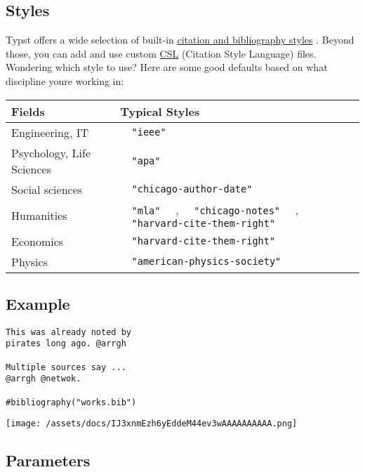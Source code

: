 \subsection{Styles}\label{styles}

Typst offers a wide selection of built-in
\href{/docs/reference/model/bibliography/\#parameters-style}{citation
and bibliography styles} . Beyond those, you can add and use custom
\href{https://citationstyles.org/}{CSL} (Citation Style Language) files.
Wondering which style to use? Here are some good defaults based on what
discipline you\textquotesingle re working in:

\begin{longtable}[]{@{}ll@{}}
\toprule\noalign{}
Fields & Typical Styles \\
\midrule\noalign{}
\endhead
\bottomrule\noalign{}
\endlastfoot
Engineering, IT & \texttt{\ }{\texttt{\ "ieee"\ }}\texttt{\ } \\
Psychology, Life Sciences &
\texttt{\ }{\texttt{\ "apa"\ }}\texttt{\ } \\
Social sciences &
\texttt{\ }{\texttt{\ "chicago-author-date"\ }}\texttt{\ } \\
Humanities & \texttt{\ }{\texttt{\ "mla"\ }}\texttt{\ } ,
\texttt{\ }{\texttt{\ "chicago-notes"\ }}\texttt{\ } ,
\texttt{\ }{\texttt{\ "harvard-cite-them-right"\ }}\texttt{\ } \\
Economics &
\texttt{\ }{\texttt{\ "harvard-cite-them-right"\ }}\texttt{\ } \\
Physics &
\texttt{\ }{\texttt{\ "american-physics-society"\ }}\texttt{\ } \\
\end{longtable}

\subsection{Example}\label{example}

\begin{verbatim}
This was already noted by
pirates long ago. @arrgh

Multiple sources say ...
@arrgh @netwok.

#bibliography("works.bib")
\end{verbatim}

\texttt{[image: /assets/docs/IJ3xnmEzh6yEddeM44ev3wAAAAAAAAAA.png]}

\subsection{\texorpdfstring{{ Parameters
}}{ Parameters }}\label{parameters}

